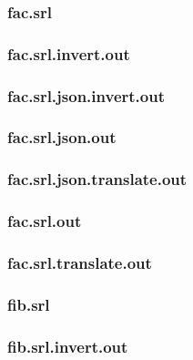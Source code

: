 \subsubsection{fac.srl}
\label{app:fac_srl}

\subsubsection{fac.srl.invert.out}
\label{app:fac_srl.invert.out}

\subsubsection{fac.srl.json.invert.out}
\label{app:fac_srl.json.invert.out}

\subsubsection{fac.srl.json.out}
\label{app:fac_srl.json.out}

\subsubsection{fac.srl.json.translate.out}
\label{app:fac_srl.json.translate.out}

\subsubsection{fac.srl.out}
\label{app:fac_srl.out}

\subsubsection{fac.srl.translate.out}
\label{app:fac_srl.translate.out}

\subsubsection{fib.srl}
\label{app:fib_srl}

\subsubsection{fib.srl.invert.out}
\label{app:fib_srl.invert.out}

